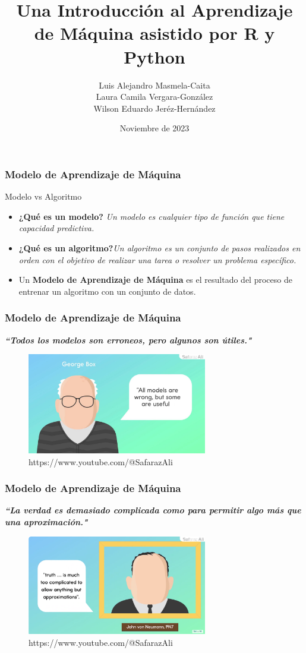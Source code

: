 \documentclass{beamer}
\title{Una Introducción al Aprendizaje de Máquina asistido por R y Python}
\author[iprea@udistrital.edu.co]{Luis Alejandro Masmela-Caita\\
Laura Camila Vergara-González\\
Wilson Eduardo Jeréz-Hernández}
\date{Noviembre de 2023}
\begin{document}
	
	\frame{\titlepage}
	
	
	\begin{frame}
		\frametitle{Modelo de Aprendizaje de Máquina}
						\begin{block}{Modelo vs Algoritmo}	
		\begin{itemize}
			\item \textbf{¿Qué es un modelo?} \textit{Un modelo es cualquier tipo de función que tiene capacidad predictiva.}
			\item\textbf{¿Qué es un algoritmo?}\textit{Un algoritmo es un conjunto de pasos realizados en orden  con el objetivo de realizar una tarea o resolver un problema específico.}
			\item Un \textbf{Modelo de Aprendizaje de Máquina} es el resultado del proceso de entrenar un algoritmo con un conjunto de datos.
		\end{itemize}
	\end{block}
	\end{frame}
	
	
	\begin{frame}
	\frametitle{Modelo de Aprendizaje de Máquina}
\textit{\textbf{``Todos los modelos son erroneos, pero algunos son útiles."}}
	\begin{figure}
		\includegraphics[width=0.7\textwidth]{Box_imagen.jpg}
		\caption{https://www.youtube.com/@SafarazAli}
	\end{figure}
	\end{frame}
	
	
		\begin{frame}
		\frametitle{Modelo de Aprendizaje de Máquina}
		\textit{\textbf{``La verdad es demasiado complicada como para permitir algo más que una aproximación."}}
		\begin{figure}
			\includegraphics[width=0.7\textwidth]{Von_Newman_imagen}
			\caption{https://www.youtube.com/@SafarazAli}
		\end{figure}
	\end{frame}
	
\end{document}
